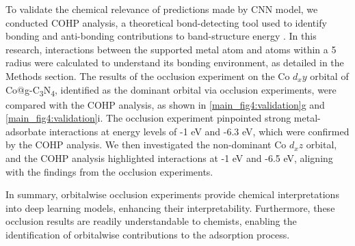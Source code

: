 To validate the chemical relevance of predictions made by CNN model, we conducted COHP analysis, a theoretical bond-detecting tool used to identify bonding and anti-bonding contributions to band-structure energy \cite{deringer2011crystal}.
In this research, interactions between the supported metal atom and atoms within a 5 \text{\AA} radius were calculated to understand its bonding environment, as detailed in the Methods section.
The results of the occlusion experiment on the Co $d_xy$ orbital of Co@g-C\textsubscript{3}N\textsubscript{4}, identified as the dominant orbital via occlusion experiments, were compared with the COHP analysis, as shown in \cref{main_fig4:validation}g and \cref{main_fig4:validation}i.
The occlusion experiment pinpointed strong metal-adsorbate interactions at energy levels of -1 eV and -6.3 eV, which were confirmed by the COHP analysis.
We then investigated the non-dominant Co $d_xz$ orbital, and the COHP analysis highlighted interactions at -1 eV and -6.5 eV, aligning with the findings from the occlusion experiments.

In summary, orbitalwise occlusion experiments provide chemical interpretations into deep learning models, enhancing their interpretability.
Furthermore, these occlusion results are readily understandable to chemists, enabling the identification of orbitalwise contributions to the adsorption process.
